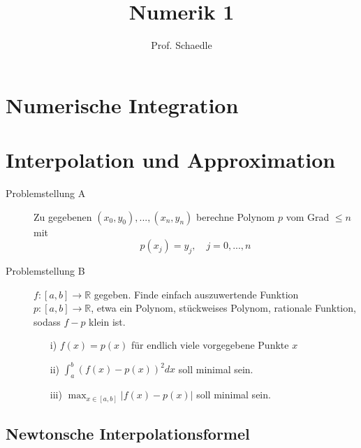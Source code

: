 \documentclass[12pt]{article}
\author{Prof. Schaedle}
\title{Numerik 1}
\theoremstyle{break}
\begin{document}
\maketitle

\newpage

\section{Numerische Integration}


\section{Interpolation und Approximation}

\begin{description}
  \item[Problemstellung A]
    Zu gegebenen $(x_0, y_0), ...,(x_n, y_n)$ berechne Polynom $p$ vom Grad $\leq n$ mit $$p(x_j) = y_j, \quad j=0,...,n$$
  
  \item[Problemstellung B]
    $f:[a,b] \rightarrow \mathbb{R}$ gegeben. Finde einfach auszuwertende Funktion $p: [a,b] \rightarrow \mathbb{R}$, etwa ein Polynom, stückweises Polynom, rationale Funktion, sodass $f-p$ klein ist.
    \begin{enumerate}
      \item[i)] $f(x)=p(x)$ für endlich viele vorgegebene Punkte $x$
      \item[ii)] $\int_a^b (f(x)-p(x))^2 dx$ soll minimal sein.
      \item[iii)] $\max_{x \in [a,b]} \vert f(x) -p(x) \vert$ soll minimal sein.
    \end{enumerate}
\end{description}

\subsection{Newtonsche Interpolationsformel}
\end{document}
